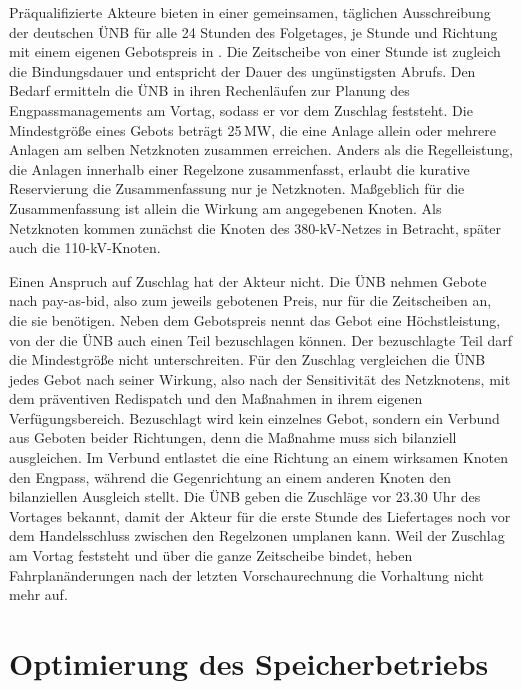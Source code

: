 Präqualifizierte Akteure bieten in einer gemeinsamen, täglichen Ausschreibung der deutschen \ac{ÜNB} für alle 24 Stunden des Folgetages, je Stunde und Richtung mit einem eigenen Gebotspreis in \EurMWh{}.
Die Zeitscheibe von einer Stunde ist zugleich die Bindungsdauer und entspricht der Dauer des ungünstigsten Abrufs.
Den Bedarf ermitteln die \ac{ÜNB} in ihren Rechenläufen zur Planung des Engpassmanagements am Vortag, sodass er vor dem Zuschlag feststeht.
Die Mindestgröße eines Gebots beträgt 25\,\si{MW}, die eine Anlage allein oder mehrere Anlagen am selben Netzknoten zusammen erreichen.
Anders als die Regelleistung, die Anlagen innerhalb einer Regelzone zusammenfasst, erlaubt die kurative Reservierung die Zusammenfassung nur je Netzknoten.
Maßgeblich für die Zusammenfassung ist allein die Wirkung am angegebenen Knoten.
Als Netzknoten kommen zunächst die Knoten des 380-kV-Netzes in Betracht, später auch die 110-kV-Knoten.

Einen Anspruch auf Zuschlag hat der Akteur nicht.
Die \ac{ÜNB} nehmen Gebote nach pay-as-bid, also zum jeweils gebotenen Preis, nur für die Zeitscheiben an, die sie benötigen.
Neben dem Gebotspreis nennt das Gebot eine Höchstleistung, von der die \ac{ÜNB} auch einen Teil bezuschlagen können.
Der bezuschlagte Teil darf die Mindestgröße nicht unterschreiten.
Für den Zuschlag vergleichen die \ac{ÜNB} jedes Gebot nach seiner Wirkung, also nach der Sensitivität des Netzknotens, mit dem präventiven Redispatch und den Maßnahmen in ihrem eigenen Verfügungsbereich.
Bezuschlagt wird kein einzelnes Gebot, sondern ein Verbund aus Geboten beider Richtungen, denn die Maßnahme muss sich bilanziell ausgleichen.
Im Verbund entlastet die eine Richtung an einem wirksamen Knoten den Engpass, während die Gegenrichtung an einem anderen Knoten den bilanziellen Ausgleich stellt.
Die \ac{ÜNB} geben die Zuschläge vor 23.30 Uhr des Vortages bekannt, damit der Akteur für die erste Stunde des Liefertages noch vor dem Handelsschluss zwischen den Regelzonen umplanen kann.
Weil der Zuschlag am Vortag feststeht und über die ganze Zeitscheibe bindet, heben Fahrplanänderungen nach der letzten Vorschaurechnung die Vorhaltung nicht mehr auf.

\section{Optimierung des Speicherbetriebs}
\label{sec:model_scope}

